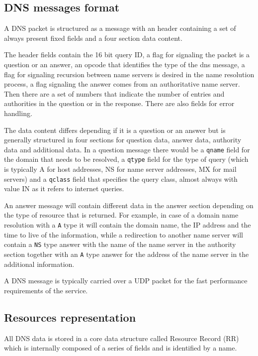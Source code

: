 \documentclass[11pt,a4paper]{article}
\begin{document}
\subsection{DNS messages format}
A DNS packet is structured as a message with an header containing a set of always present fixed fields and a four section data content.

\hfill \break
\noindent
The header fields contain the 16 bit query ID, a flag for signaling the packet is a question or an answer, an opcode that identifies the type of the dns message, a flag for signaling recursion between name servers is desired in the name resolution process, a flag signaling the answer comes from an authoritative name server. Then there are a set of numbers that indicate the number of entries and authorities in the question or in the response. There are also fields for error handling.

\hfill \break
\noindent
The data content differs depending if it is a question or an answer but is generally structured in four sections for question data, answer data, authority data and additional data. 
In a question message there would be a \texttt{qname} field for the domain that needs to be resolved, a \texttt{qtype} field for the type of query (which is typically A for host addresses, NS for name server addresses, MX for mail servers) and a \texttt{qclass} field that specifies the query class, almost always with value IN as it refers to internet queries.

\noindent
An answer message will contain different data in the answer section depending on the type of resource that is returned. For example, in case of a domain name resolution with a \texttt{A} type it will contain the domain name, the IP address and the time to live of the information, while a redirection to another name server will contain a \texttt{NS} type answer with the name of the name server in the authority section together with an \texttt{A} type answer for the address of the name server in the additional information.

\hfill \break
\noindent
A DNS message is typically carried over a UDP packet for the fast performance requirements of the service.

\subsection{Resources representation}
All DNS data is stored in a core data structure called Resource Record (RR) which is internally composed of a series of fields and is identified by a name.
\end{document}
